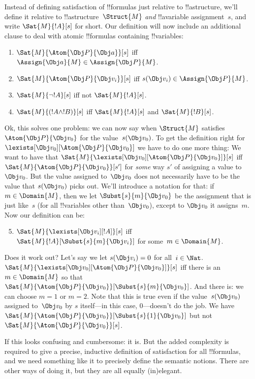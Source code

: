 Instead of defining satisfaction of !!{formula}s just relative to
!!a{structure}, we'll define it relative to
!!a{structure}~$\Struct{M}$ \emph{and} !!a{variable} assignment~$s$,
and write $\Sat{M}{!A}[s]$ for short. Our definition will now include
an additional clause to deal with atomic !!{formula}s containing
!!{variable}s:
\begin{enumerate}
  \item $\Sat{M}{\Atom{\Obj P}{\Obj a}}[s]$ iff
  $\Assign{\Obj a}{M} \in \Assign{\Obj P}{M}$.
  \item $\Sat{M}{\Atom{\Obj P}{\Obj v_i}}[s]$ iff
  $s(\Obj v_i) \in \Assign{\Obj P}{M}$.
  \item $\Sat{M}{\lnot !A}[s]$ iff not $\Sat{M}{!A}[s]$.
  \item $\Sat{M}{(!A \land !B)}[s]$ iff $\Sat{M}{!A}[s]$ and $\Sat{M}{!B}[s]$.
\end{enumerate}
Ok, this solves one problem: we can now say when $\Struct{M}$
satisfies $\Atom{\Obj P}{\Obj v_0}$ for the value~$s(\Obj v_0)$. To
get the definition right for $\lexists[\Obj v_0][\Atom{\Obj P}{\Obj
v_0}]$ we have to do one more thing:  We want to have that
$\Sat{M}{\lexists[\Obj v_0][\Atom{\Obj P}{\Obj v_0}]}[s]$ iff
$\Sat{M}{\Atom{\Obj P}{\Obj v_0}}[s']$ for \emph{some} way $s'$ of
assigning a value to~$\Obj v_0$. But the value assigned to~$\Obj v_0$
does not necessarily have to be the value that $s(\Obj v_0)$ picks
out.  We'll introduce a notation for that: if $m \in \Domain{M}$, then
we let $\Subst{s}{m}{\Obj v_0}$ be the assignment that is just
like~$s$ (for all !!{variable}s other than~$\Obj v_0$), except to
$\Obj v_0$ it assigns~$m$. Now our definition can be:
\begin{enumerate}\setcounter{enumi}{4}
  \item $\Sat{M}{\lexists[\Obj v_i][!A]}[s]$ iff
  $\Sat{M}{!A}[\Subst{s}{m}{\Obj v_i}]$ for some~$m \in \Domain{M}$.
\end{enumerate}
Does it work out? Let's say we let $s(\Obj v_i) = 0$ for all~$i \in
\Nat$. $\Sat{M}{\lexists[\Obj v_0][\Atom{\Obj P}{\Obj v_0}]}[s]$ iff
there is an $m \in \Domain{M}$ so that $\Sat{M}{\Atom{\Obj P}{\Obj
v_0}}[\Subst{s}{m}{\Obj v_0}]$. And there is: we can choose $m = 1$ or
$m = 2$. Note that this is true even if the value~$s(\Obj v_0)$
assigned to~$\Obj v_0$ by $s$ itself---in this case, $0$---doesn't do
the job. We have $\Sat{M}{\Atom{\Obj P}{\Obj v_0}}[\Subst{s}{1}{\Obj
v_0}]$ but not $\Sat{M}{\Atom{\Obj P}{\Obj v_0}}[s]$.

If this looks confusing and cumbersome: it is. But the added
complexity is required to give a precise, inductive definition of
satisfaction for all !!{formula}s, and we need something like it to
precisely define the semantic notions.  There are other ways of doing
it, but they are all equally (in)elegant.





